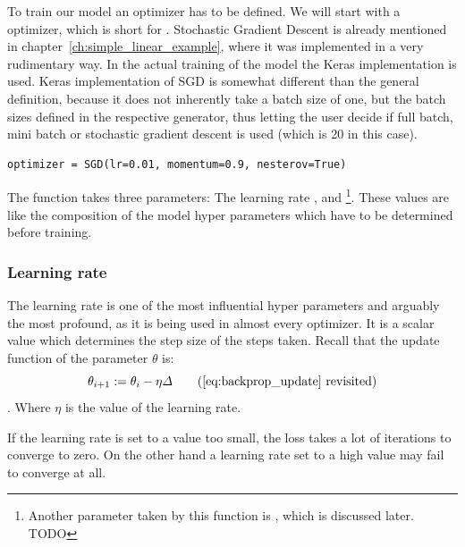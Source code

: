 To train our model an optimizer has to be defined.
We will start with a  optimizer, which is short for . Stochastic Gradient Descent is already mentioned in chapter~\ref{ch:simple_linear_example}, where it was implemented in a very rudimentary way. In the actual training of the model the Keras implementation is used.
Keras implementation of SGD is somewhat different than the general definition, because it does not inherently take a batch size of one, but the batch sizes defined in the respective generator, thus letting the user decide if full batch, mini batch or stochastic gradient descent is used (which is 20 in this case).

\begin{lstlisting}
optimizer = SGD(lr=0.01, momentum=0.9, nesterov=True)
\end{lstlisting}

The  function takes three parameters: The learning rate ,  and \footnote{Another parameter taken by this function is , which is discussed later. TODO }.
These values are like the composition of the model hyper parameters which have to be determined before training.

\subsubsection{Learning rate}

The learning rate is one of the most influential hyper parameters and arguably the most profound, as it is being used in almost every optimizer.
It is a scalar value which determines the step size of the steps taken. Recall that the update function of the parameter $\theta$ is:
\begin{equation}
    \theta_{i+1} := \theta_i - \eta \varDelta \tag{\ref{eq:backprop_update} revisited}
\end{equation}.
Where $\eta$ is the value of the learning rate.

If the learning rate is set to a value too small, the loss takes a lot of iterations to converge to zero.
On the other hand a learning rate set to a high value may fail to converge at all.

